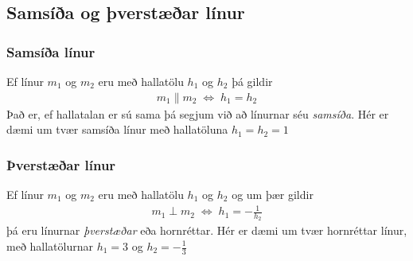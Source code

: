 \documentclass[a4paper,10pt,icelandic]{sphinxmanual}
\begin{document}
\subsection{Samsíða og þverstæðar línur}
\label{\detokenize{Kafli03:samsia-og-verstaear-linur}}

\subsubsection{Samsíða línur}
\label{\detokenize{Kafli03:samsia-linur}}\label{\detokenize{Kafli03:s-samsia}}
Ef línur \(m_1\) og \(m_2\) eru með hallatölu \(h_1\) og \(h_2\) þá gildir
\begin{equation*}
\begin{split}m_1 \parallel m_2 \; \Longleftrightarrow \; h_1 = h_2\end{split}
\end{equation*}
Það er, ef hallatalan er sú sama þá segjum við að línurnar séu \textit{samsíða}.
Hér er dæmi um tvær samsíða línur með hallatöluna \(h_1=h_2=1\)



\subsubsection{Þverstæðar línur}
\label{\detokenize{Kafli03:verstaear-linur}}\label{\detokenize{Kafli03:s-verstae}}
Ef línur \(m_1\) og \(m_2\) eru með hallatölu \(h_1\) og \(h_2\) og um þær gildir
\begin{equation*}
\begin{split}m_1 \perp m_2 \; \Longleftrightarrow \; h_1 = -\frac{1}{h_2}\end{split}
\end{equation*}
þá eru línurnar \textit{þverstæðar} eða hornréttar.
Hér er dæmi um tvær hornréttar línur, með hallatölurnar \(h_1=3\) og \(h_2=-\frac{1}{3}\)

\end{document}
